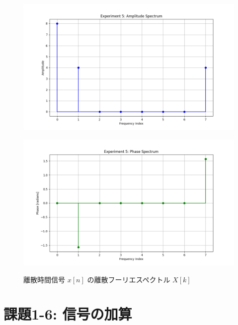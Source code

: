 \documentclass[fleqn, a4paper. 12pt]{jsarticle}
\begin{document}
  \begin{figure}[h]
    \begin{center}
    \begin{minipage}[t]{0.48\columnwidth}
        \includegraphics[width=\columnwidth]{amplitude_spectrum_experiment_5.png}
        \label{fign:a5}
    \end{minipage}
    \begin{minipage}[t]{0.48\columnwidth}
        \includegraphics[width=\columnwidth]{phase_spectrum_experiment_5.png}
        \label{fign:p5}
    \end{minipage}
    \end{center}
    \caption{離散時間信号 $x[n]$ の離散フーリエスペクトル $X[k]$}
  \end{figure}

  \newpage

  \section*{課題1-6: 信号の加算}
\end{document}
